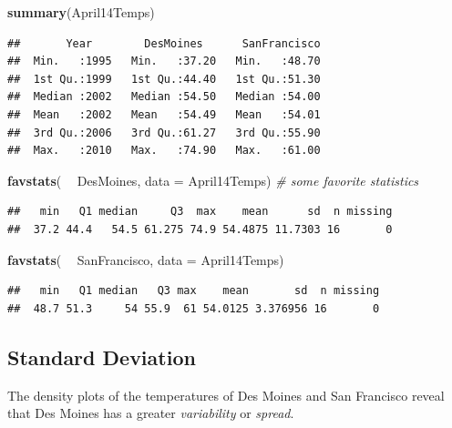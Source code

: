 \documentclass[]{book}
\newenvironment{Shaded}{\begin{snugshade}}{\end{snugshade}}
\newcommand{\CommentTok}[1]{\textcolor[rgb]{0.56,0.35,0.01}{\textit{#1}}}
\newcommand{\DataTypeTok}[1]{\textcolor[rgb]{0.13,0.29,0.53}{#1}}
\newcommand{\KeywordTok}[1]{\textcolor[rgb]{0.13,0.29,0.53}{\textbf{#1}}}
\newcommand{\NormalTok}[1]{#1}
\newcommand{\OperatorTok}[1]{\textcolor[rgb]{0.81,0.36,0.00}{\textbf{#1}}}
\newcommand{\StringTok}[1]{\textcolor[rgb]{0.31,0.60,0.02}{#1}}
\begin{document}
\begin{Shaded}
\begin{Highlighting}[]
\KeywordTok{summary}\NormalTok{(April14Temps)}
\end{Highlighting}
\end{Shaded}

\begin{verbatim}
##       Year        DesMoines      SanFrancisco  
##  Min.   :1995   Min.   :37.20   Min.   :48.70  
##  1st Qu.:1999   1st Qu.:44.40   1st Qu.:51.30  
##  Median :2002   Median :54.50   Median :54.00  
##  Mean   :2002   Mean   :54.49   Mean   :54.01  
##  3rd Qu.:2006   3rd Qu.:61.27   3rd Qu.:55.90  
##  Max.   :2010   Max.   :74.90   Max.   :61.00
\end{verbatim}

\begin{Shaded}
\begin{Highlighting}[]
\KeywordTok{favstats}\NormalTok{( }\OperatorTok{~}\StringTok{ }\NormalTok{DesMoines, }\DataTypeTok{data =}\NormalTok{ April14Temps) }\CommentTok{# some favorite statistics}
\end{Highlighting}
\end{Shaded}

\begin{verbatim}
##   min   Q1 median     Q3  max    mean      sd  n missing
##  37.2 44.4   54.5 61.275 74.9 54.4875 11.7303 16       0
\end{verbatim}

\begin{Shaded}
\begin{Highlighting}[]
\KeywordTok{favstats}\NormalTok{( }\OperatorTok{~}\StringTok{ }\NormalTok{SanFrancisco, }\DataTypeTok{data =}\NormalTok{ April14Temps)}
\end{Highlighting}
\end{Shaded}

\begin{verbatim}
##   min   Q1 median   Q3 max    mean       sd  n missing
##  48.7 51.3     54 55.9  61 54.0125 3.376956 16       0
\end{verbatim}

\hypertarget{standard-deviation}{%
\subsection{Standard Deviation}\label{standard-deviation}}

The density plots of the temperatures of Des Moines and San Francisco reveal that Des Moines has a greater \emph{variability} or \emph{spread}.
\end{document}

